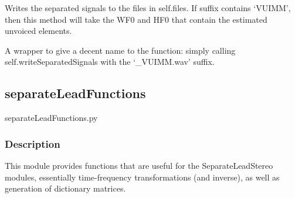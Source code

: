 \documentclass[letterpaper,10pt,english]{sphinxmanual}
\begin{document}
\begin{fulllineitems}
\begin{fulllineitems}
\end{fulllineitems}


\begin{fulllineitems}
\label{reference/separateleadstereo:pyfasst.SeparateLeadStereo.SeparateLeadStereoTF.SeparateLeadProcess.writeSeparatedSignals}
Writes the separated signals to the files in self.files.
If suffix contains `VUIMM', then this method will take
the WF0 and HF0 that contain the estimated unvoiced elements.

\end{fulllineitems}


\begin{fulllineitems}
\label{reference/separateleadstereo:pyfasst.SeparateLeadStereo.SeparateLeadStereoTF.SeparateLeadProcess.writeSeparatedSignalsWithUnvoice}
A wrapper to give a decent name to the function: simply
calling self.writeSeparatedSignals with the
`\_VUIMM.wav' suffix.

\end{fulllineitems}


\end{fulllineitems}



\subsection{separateLeadFunctions}
\label{reference/separateleadfunctions:separateleadfunctions}\label{reference/separateleadfunctions::doc}\label{reference/separateleadfunctions:module-pyfasst.SeparateLeadStereo.separateLeadFunctions}
separateLeadFunctions.py


\subsubsection{Description}
\label{reference/separateleadfunctions:description}
This module provides functions that are useful for the SeparateLeadStereo
modules, essentially time-frequency transformations (and inverse), as well
as generation of dictionary matrices.
\end{document}
